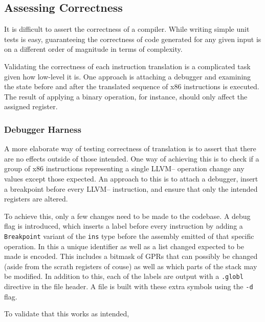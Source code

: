 \documentclass{article}
\begin{document}
%

\subsection{Assessing Correctness}
It is difficult to assert the correctness of a compiler. While writing simple unit tests is easy, guaranteeing the correctness of code generated for any given input is on a different order of magnitude in terms of complexity.

Validating the correctness of each instruction translation is a complicated task given how low-level it is. One approach is attaching a debugger and examining the state before and after the translated sequence of x86 instructions is executed. The result of applying a binary operation,  for instance, should only affect the assigned register.

\subsubsection{Debugger Harness}
A more elaborate way of testing correctness of translation is to assert that there are no effects outside of those intended. One way of achieving this is to check if a group of x86 instructions representing a single LLVM-- operation change any values except those expected. An approach to this is to attach a debugger, insert a breakpoint before every LLVM-- instruction, and ensure that only the intended registers are altered.

To achieve this, only a few changes need to be made to the codebase. A debug flag is introduced, which inserts a label before every instruction by adding a \lstinline!Breakpoint! variant of the \lstinline!ins! type before the assembly emitted of that specific operation. In this a unique identifier as well as a list changed expected to be made is encoded. 
This includes a bitmask of GPRs that can possibly be changed (aside from the scrath registers of couse) as well as which parts of the stack may be modified. %
In addition to this, each of the labels are output with a \lstinline!.globl! directive in the file header. A file is built with these extra symbols using the \lstinline!-d! flag.

To validate that this works as intended, 


\end{document}
